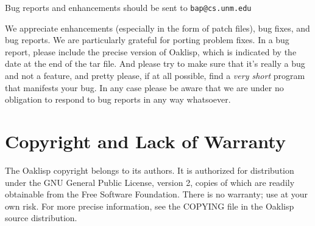 Bug reports and enhancements should be sent to \texttt{bap@cs.unm.edu}

We appreciate enhancements (especially in the form of patch files),
bug fixes, and bug reports.  We are particularly grateful for porting
problem fixes.  In a bug report, please include the precise version of
Oaklisp, which is indicated by the date at the end of the tar file.
And please try to make sure that it's really a bug and not a feature,
and pretty please, if at all possible, find a \emph{very short} program
that manifests your bug.  In any case please be aware that we are
under no obligation to respond to bug reports in any way whatsoever.

\section{Copyright and Lack of Warranty}

The Oaklisp copyright belongs to its authors.  It is authorized for
distribution under the GNU General Public License, version 2, copies
of which are readily obtainable from the Free Software Foundation.
There is no warranty; use at your own risk.  For more precise
information, see the COPYING file in the Oaklisp source distribution.
